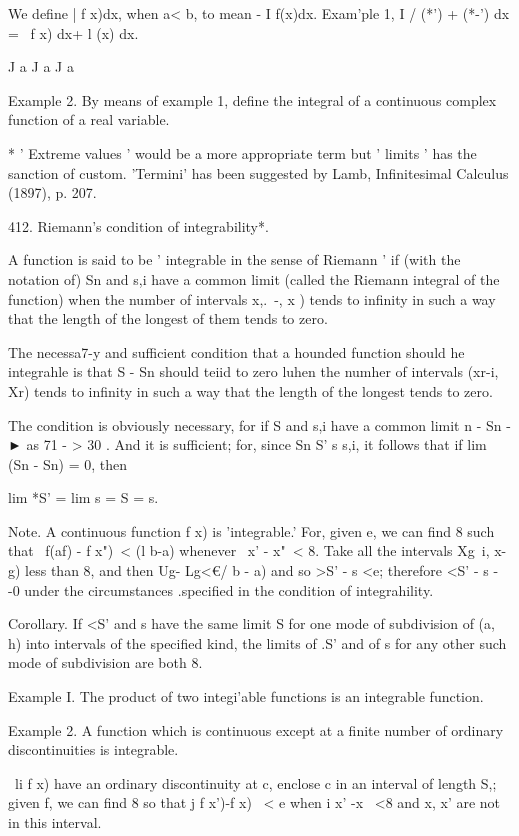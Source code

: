We define | f x)dx, when a< b, to mean - I f(x)dx. Exam'ple 1, I /
(*') + (*-') dx = \ f x) dx+ l (x) dx.

J a J a J a

Example 2. By means of example 1, define the integral of a continuous
complex function of a real variable.

* ' Extreme values ' would be a more appropriate term but ' limits '
has the sanction of custom. 'Termini' has been suggested by Lamb,
Infinitesimal Calculus (1897), p. 207.

%
%

412. Riemann's condition of integrability*.

A function is said to be ' integrable in the sense of Riemann ' if
(with the notation of) Sn and s,i have a common limit (called
the Riemann integral of the function) when the number of intervals
x,.\ -, x ) tends to infinity in such a way that the length of the
longest of them tends to zero.

The necessa7-y and sufficient condition that a hounded function should
he integrahle is that S - Sn should teiid to zero luhen the numher of
intervals (xr-i, Xr) tends to infinity in such a way that the length
of the longest tends to zero.

The condition is obviously necessary, for if S and s,i have a common
limit n - Sn - ► as 71 - > 30 . And it is sufficient; for, since Sn
S' s s,i, it follows that if lim (Sn - Sn) = 0, then

lim *S' = lim s = S = s.

Note. A continuous function f x) is 'integrable.' For, given e, we can
find 8 such that \ f(af) - f x")\ < (l b-a) whenever \ x' - x"\ < 8.
Take all the intervals Xg\ i, x-g) less than 8, and then Ug- Lg<€/ b -
a) and so >S' - s <e; therefore <S' - s - -0 under the circumstances
.specified in the condition of integrahility.

Corollary. If <S' and s have the same limit S for one mode of
subdivision of (a, h) into intervals of the specified kind, the limits
of .S' and of s for any other such mode of subdivision are both 8.

Example I. The product of two integi'able functions is an integrable
function.

Example 2. A function which is continuous except at a finite number of
ordinary discontinuities is integrable.

\ li f x) have an ordinary discontinuity at c, enclose c in an
interval of length S,; given f, we can find 8 so that j f x')-f x) \
< e when i x' -x \ <8 and x, x' are not in this interval.

